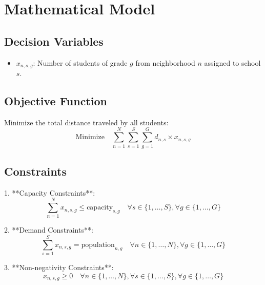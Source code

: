 \documentclass{article}
\begin{document}
\section*{Mathematical Model}

\subsection*{Decision Variables}
\begin{itemize}
    \item $x_{n,s,g}$: Number of students of grade $g$ from neighborhood $n$ assigned to school $s$.
\end{itemize}

\subsection*{Objective Function}
Minimize the total distance traveled by all students:
\[
\text{Minimize} \quad \sum_{n=1}^{N} \sum_{s=1}^{S} \sum_{g=1}^{G} d_{n,s} \times x_{n,s,g}
\]

\subsection*{Constraints}
1. **Capacity Constraints**:
\[
\sum_{n=1}^{N} x_{n,s,g} \leq \text{capacity}_{s,g} \quad \forall s \in \{1, \ldots, S\}, \forall g \in \{1, \ldots, G\}
\]

2. **Demand Constraints**:
\[
\sum_{s=1}^{S} x_{n,s,g} = \text{population}_{n,g} \quad \forall n \in \{1, \ldots, N\}, \forall g \in \{1, \ldots, G\}
\]

3. **Non-negativity Constraints**:
\[
x_{n,s,g} \geq 0 \quad \forall n \in \{1, \ldots, N\}, \forall s \in \{1, \ldots, S\}, \forall g \in \{1, \ldots, G\}
\]
\end{document}
